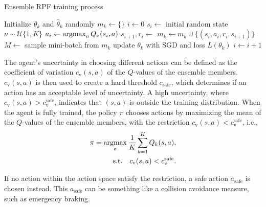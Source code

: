 \begin{algorithm}[h]
	\caption{Ensemble RPF training process}\label{alg:ensamble_training}
	\begin{algorithmic}[1]
			\State Initialize $\theta_k$ and $\hat{\theta}_k$ randomly
			\State $m_k \gets \{\}$
		\EndFor
		\State $i \gets 0$
			\State $s_i \gets $ initial random state
			\State $\nu \sim \mathcal{U}\{1,K\}$%
				\State $a_i \gets \operatorname*{argmax}_{a} Q_\nu(s_i,a)$
				\State $s_{i+1}, r_i \gets $ 
						\State $m_k \gets m_k \cup \{(s_i, a_i, r_i, s_{i+1})\}$
					\EndIf
					\State $M \gets $ sample mini-batch from $m_k$
					\State update $\theta_k$ with SGD and loss $L(\theta_k)$
				\EndFor
				\State $i \gets i + 1$
			\EndWhile
		\EndWhile
	\end{algorithmic}
\end{algorithm}

The agent's uncertainty in choosing different actions can be defined as the coefficient of variation $c_\mathrm{v}(s,a)$ of the $Q$-values of the ensemble members. $c_\mathrm{v}(s,a)$ is then used to create a hard threshold $c_\mathrm{safe}$, which determines if an action has an acceptable level of uncertainty. 
A high uncertainty, where $c_\mathrm{v}(s,a) > c_\mathrm{v}^\mathrm{safe}$, indicates that $(s,a)$ is outside the training distribution. 
When the agent is fully trained, the policy $\pi$ chooses actions by maximizing the mean of the $Q$-values of the ensemble members, with the restriction $c_\mathrm{v}(s,a) < c_\mathrm{v}^\mathrm{safe}$, i.e.,
%
\begin{equation}
	\begin{aligned}
		\pi = \operatorname*{argmax}_{a} \frac{1}{K} \sum_{k=1}^K Q_k(s,a),\\
		\textrm{s.t.} \quad c_\mathrm{v}(s,a) < c_\mathrm{v}^\mathrm{safe}.
	\end{aligned}
\end{equation}

If no action within the action space satisfy the restriction, a safe action $a_\mathrm{safe}$ is chosen instead. This $a_\mathrm{safe}$ can be something like a collision avoidance measure, such as emergency braking.
%

